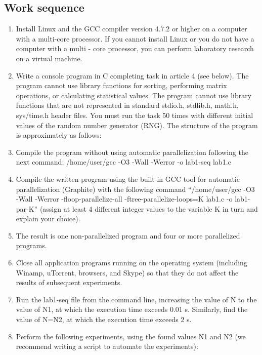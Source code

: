 { %
	\subsection{Work sequence}
	\begin{enumerate}
		\item Install Linux and the GCC compiler version 4.7.2 or higher on a computer with a multi-core processor. If you cannot install Linux or you do not have a computer with a multi - core processor, you can perform laboratory research on a virtual machine.
		\item Write a console program in C completing task in article 4 (see below). The program cannot use library functions for sorting, performing matrix operations, or calculating statistical values. The program cannot use library functions that are not represented in standard stdio.h, stdlib.h, math.h, sys/time.h header files. You must run the task 50 times with different initial values of the random number generator (RNG). The structure of the program is approximately as follows:
			\begin{figure}[H]
				
			\end{figure}
		\item Сompile the program without using automatic parallelization following the next command: /home/user/gcc -O3 -Wall -Werror -o lab1-seq lab1.c
		\item Compile the written program using the built-in GCC tool for automatic parallelization (Graphite) with the following command  “/home/user/gcc -O3 -Wall -Werror -floop-parallelize-all -ftree-parallelize-loops=K lab1.c -o lab1-par-K” (assign at least 4 different integer values to the variable K in turn and explain your choice).
		\item The result is one non-parallelized program and four or more parallelized programs.
		\item Close all application programs running on the operating system (including Winamp, uTorrent, browsers, and Skype) so that they do not affect the results of subsequent experiments.
		\item Run the lab1-seq file from the command line, increasing the value of N to the value of N1, at which the execution time exceeds 0.01 s. Similarly, find the value of N=N2, at which the execution time exceeds 2 s.
		\item Perform the following experiments, using the found values N1 and N2 (we recommend writing a script to automate the experiments):
			\begin{itemize}

\end{itemize}
\end{enumerate}}
